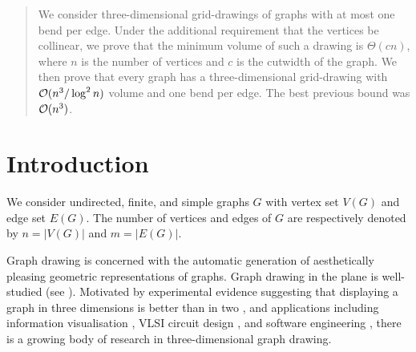 \documentclass[a4paper]{article}
\newcommand{\Oh}[1]{\ensuremath{\protect\mathcal{O}(#1)}}
\newcommand{\mySection}[2]{\section{#1}\seclabel{#2}}
\newcommand{\seclabel}[1]{\label{sec:#1}}
\theoremstyle{plain}
\begin{document}




\begin{abstract} 
We consider three-dimensional  grid-drawings of graphs with at most one bend per edge.  Under the additional requirement that the vertices be collinear, we prove that the minimum volume of such a drawing is $\Theta(cn)$, where $n$ is the number of vertices and $c$ is the cutwidth of the graph. We then prove  that every graph has a  three-dimensional  grid-drawing with \Oh{n^3/\log^2 n} volume and one bend per edge. The best previous bound was \Oh{n^3}. 
\end{abstract}

\Body

\mySection{Introduction}{Introduction}

We consider  undirected, finite, and simple graphs $G$ with  vertex set $V(G)$ and edge set $E(G)$. The number of vertices and edges of $G$ are respectively denoted by $n=|V(G)|$ and $m=|E(G)|$. 

Graph drawing is concerned with the automatic generation of aesthetically
pleasing geometric representations of graphs. Graph drawing in the plane is
well-studied (see \cite{DETT99, KaufmannWagner01}). Motivated by experimental
evidence suggesting that displaying a graph in three dimensions is better than
in two \cite{WF94, WF96}, and applications including information visualisation
\cite{WF94}, VLSI circuit design \cite{LR86}, and software engineering
\cite{WHF93}, there is a growing body of research in three-dimensional graph
drawing. 
\end{document}
